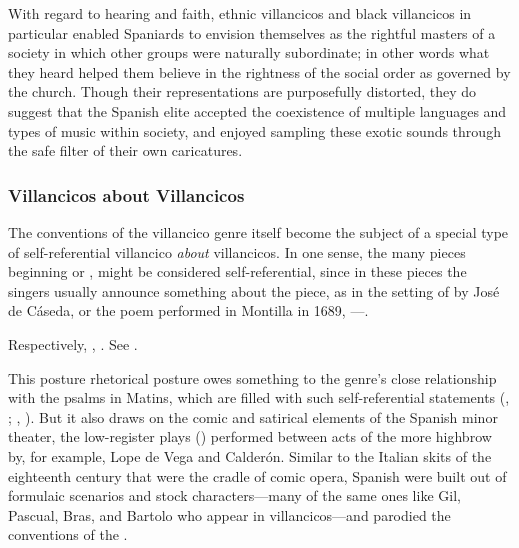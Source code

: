 With regard to hearing and faith, ethnic villancicos and black villancicos in
particular enabled Spaniards to envision themselves as the rightful masters of
a society in which other groups were naturally subordinate; in other words what
they heard helped them believe in the rightness of the social order as governed
by the church. %
Though their representations are purposefully distorted, they do suggest that
the Spanish elite accepted the coexistence of multiple languages and types of
music within society, and enjoyed sampling these exotic sounds through the safe
filter of their own caricatures.

\subsubsection{Villancicos about Villancicos}

The conventions of the villancico genre itself become the subject of a special
type of self-referential villancico \emph{about} villancicos.
In one sense, the many pieces beginning  or , might be considered self-referential, since in these pieces the
singers usually announce something about the piece, as in the setting of
 by José de Cáseda, or the poem performed in
Montilla in 1689, ---.%
    \begin{Footnote}
    Respectively, , \autocite[116 (no signature
    listed)]{BNE:VCs17C}.
    See .
    \end{Footnote}
This posture rhetorical posture owes something to the genre's close
relationship with the psalms in Matins, which are filled with such
self-referential statements (,
; ,
).
But it also draws on the comic and satirical elements of the Spanish minor
theater, the low-register plays () performed between acts of
the more highbrow  by, for example, Lope de Vega and Calderón.%
    \citXXX[entremeses]
Similar to the Italian  skits of the eighteenth
century that were the cradle of comic opera, Spanish  were
built out of formulaic scenarios and stock characters---many of the same ones
like Gil, Pascual, Bras, and Bartolo who appear in villancicos---and parodied
the conventions of the .

